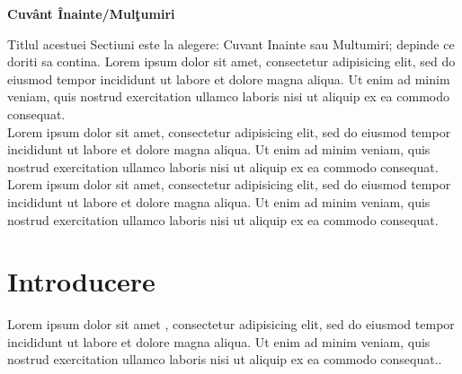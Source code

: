 \documentclass[12pt,openright,twoside]{book}
\begin{document}
\begin{center}

{\LARGE \textbf{Cuv\^ant \^Inainte/Mul\c{t}umiri}}

\end{center}

\vspace{36pt}
Titlul acestuei Sectiuni este la alegere: Cuvant Inainte sau Multumiri; depinde ce doriti sa contina. Lorem ipsum dolor sit amet, consectetur adipisicing elit, sed do eiusmod tempor incididunt ut labore et dolore magna aliqua. Ut enim ad minim veniam, quis nostrud exercitation ullamco laboris nisi ut aliquip ex ea commodo consequat.\\

Lorem ipsum dolor sit amet, consectetur adipisicing elit, sed do eiusmod tempor incididunt ut labore et dolore magna aliqua. Ut enim ad minim veniam, quis nostrud exercitation ullamco laboris nisi ut aliquip ex ea commodo consequat.\\

Lorem ipsum dolor sit amet, consectetur adipisicing elit, sed do eiusmod tempor incididunt ut labore et dolore magna aliqua. Ut enim ad minim veniam, quis nostrud exercitation ullamco laboris nisi ut aliquip ex ea commodo consequat.\\

\vspace{40pt}



\vspace*{\fill}
\newpage
\thispagestyle{empty} \vspace*{\fill} \tableofcontents

\setlength\parindent{0pt}



\setcounter{page}{0}


\newpage



\chapter{Introducere}
\label{intro}

Lorem ipsum\cite{book1} dolor sit amet \cite{book1,art1},  consectetur adipisicing elit, sed do eiusmod tempor incididunt ut labore et dolore magna aliqua. Ut enim ad minim veniam, quis nostrud exercitation ullamco laboris nisi ut aliquip ex ea commodo consequat..\\
\end{document}
